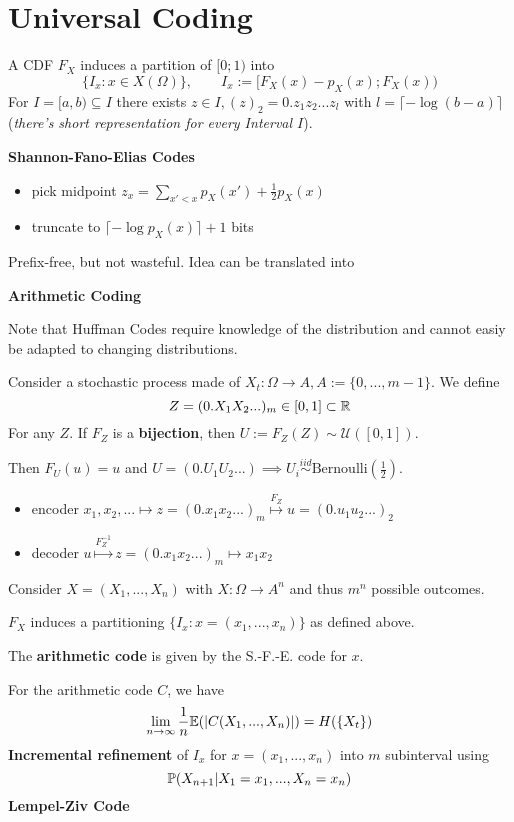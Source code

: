 \section{Universal Coding}

A CDF \(F_X\) induces a partition of \([0; 1)\) into 
\[\{I_x: x \in X(\Omega)\}, \qquad I_x := [F_X(x) - p_X(x); F_X(x))\]
For \(I = [a, b) \subseteq I\) there exists \(z \in I, (z)_2 = 0.z_1z_2...z_l\)
with \(l = \lceil - \log(b-a)\rceil\) (\textit{there's short representation for every Interval \(I\)}).

\textbf{Shannon-Fano-Elias Codes}
\begin{itemize}[label=-]
    \item pick midpoint \(z_x = \sum_{x' < x} p_X(x') + \frac{1}{2}p_X(x)\)
    \item truncate to \(\lceil - \log p_X(x) \rceil + 1\) bits
\end{itemize}
Prefix-free, but not wasteful. Idea can be translated into 

\textbf{Arithmetic Coding}

Note that Huffman Codes require knowledge of the distribution and cannot easiy be adapted to changing distributions.

Consider a stochastic process made of \(X_t: \Omega \to A, A := \{0, ..., m-1\}\). We define 
\[Z = (0.X_1X_2...)_m \in [0, 1] \subset \R\]
For any \(Z\). If \(F_Z\) is a \textbf{bijection}, then \(U := F_Z(Z) \sim \mathcal{U}([0,1])\).

Then \(F_U(u) = u\) and \(U = (0.U_1U_2...) \implies U_i \overset{iid}{\sim} \text{Bernoulli}\left(\frac{1}{2}\right)\).

\begin{itemize}[label=-]
    \item encoder \(x_1, x_2,... \mapsto z = (0.x_1x_2...)_m \overset{F_Z}{\mapsto} u = (0.u_1u_2...)_2\)
    \item decoder \(u \overset{F_Z^{-1}}{\mapsto} z = (0.x_1x_2...)_m \mapsto x_1x_2\)
\end{itemize}

Consider \(X =(X_1, ...,X_n)\) with \(X: \Omega \to A^n\) and thus \(m^n\) possible outcomes.

\(F_X\) induces a partitioning \(\{I_x: x = (x_1, ..., x_n)\}\) as defined above.

The \textbf{arithmetic code} is given by the S.-F.-E. code for \(x\).

For the arithmetic code \(C\), we have
\[\lim_{n \to \infty} \frac{1}{n}\E(|C(X_1, ..., X_n)|) = H(\{X_t\})\]
\textbf{Incremental refinement} of \(I_x\) for \(x=(x_1,...,x_n)\) into \(m\) subinterval using 
\[\P(X_{n+1} | X_1 = x_1, ..., X_n = x_n)\] 
\textbf{Lempel-Ziv Code}

